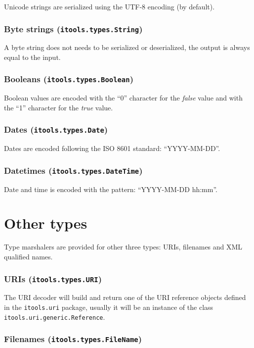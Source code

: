 Unicode strings are serialized using the UTF-8 encoding (by default).

\subsubsection{Byte strings ({\tt itools.types.String})}

A byte string does not needs to be serialized or deserialized, the
output is always equal to the input.

\subsubsection{Booleans ({\tt itools.types.Boolean})}

Boolean values are encoded with the ``0'' character for the {\em false}
value and with the ``1'' character for the {\em true} value.

\subsubsection{Dates ({\tt itools.types.Date})}

Dates are encoded following the ISO 8601 standard: ``YYYY-MM-DD''.

\subsubsection{Datetimes ({\tt itools.types.DateTime})}

Date and time is encoded with the pattern: ``YYYY-MM-DD hh:mm''.

\section{Other types}

Type marshalers are provided for other three types: URIs, filenames
and XML qualified names.


\subsubsection{URIs ({\tt itools.types.URI})}

The URI decoder will build and return one of the URI reference objects
defined in the {\tt itools.uri} package, usually it will be an instance
of the class {\tt itools.uri.generic.Reference}.


\subsubsection{Filenames ({\tt itools.types.FileName})}

